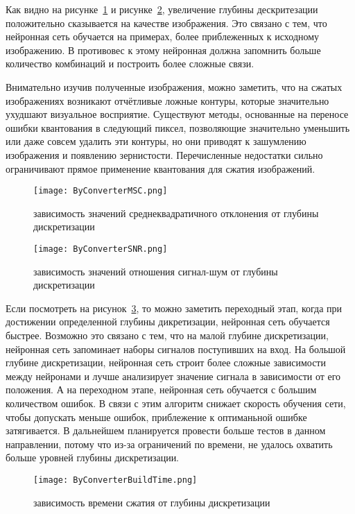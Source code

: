 Как видно на рисунке~\ref{fig:by_converter_msc} и рисунке~\ref{fig:by_converter_snr},
увеличение глубины дескритезации положительно сказывается на качестве изображения.
Это связано с тем, что нейронная сеть обучается на примерах, более приблеженных к исходному изображению.
В противовес к этому нейронная должна запомнить больше количество комбинаций и построить более сложные связи.

Внимательно изучив полученные изображения, можно заметить, что на сжатых изображениях возникают отчётливые ложные контуры,
которые значительно ухудшают визуальное восприятие. Существуют методы, основанные на переносе ошибки квантования в следующий пиксел,
позволяющие значительно уменьшить или даже совсем удалить эти контуры, но они приводят к зашумлению изображения и появлению зернистости.
Перечисленные недостатки сильно ограничивают прямое применение квантования для сжатия изображений.

\begin{figure}[ht]
\centering
  \texttt{[image: ByConverterMSC.png]}
  \caption{ зависимость значений среднеквадратичного отклонения от глубины дискретизации }
  \label{fig:by_converter_msc}
\end{figure}

\begin{figure}[ht]
\centering
  \texttt{[image: ByConverterSNR.png]}
  \caption{ зависимость значений отношения сигнал-шум от глубины дискретизации }
  \label{fig:by_converter_snr}
\end{figure}

Если посмотреть на рисунок~\ref{fig:by_converter_build_time}, то можно заметить переходный этап, когда при достижении определенной
глубины дикретизации, нейронная сеть обучается быстрее. Возможно это связано с тем, что на малой глубине дискретизации,
нейронная сеть запоминает наборы сигналов поступивших на вход. На большой глубине дискретизации, нейронная сеть строит более сложные зависимости
между нейронами и лучше анализирует значение сигнала в зависимости от его положения. А на переходном этапе, нейронная сеть обучается с большим количеством ошибок.
В связи с этим алгоритм снижает скорость обучения сети, чтобы допускать меньше ошибок, приблежение к оптиманьной ошибке затягивается.
В дальнейшем планируется провести больше тестов в данном направлении, потому что из-за ограничений по времени, не удалось охватить больше
уровней глубины дискретизации.

\begin{figure}[ht]
\centering
  \texttt{[image: ByConverterBuildTime.png]}
  \caption{ зависимость времени сжатия от глубины дискретизации }
  \label{fig:by_converter_build_time}
\end{figure}

